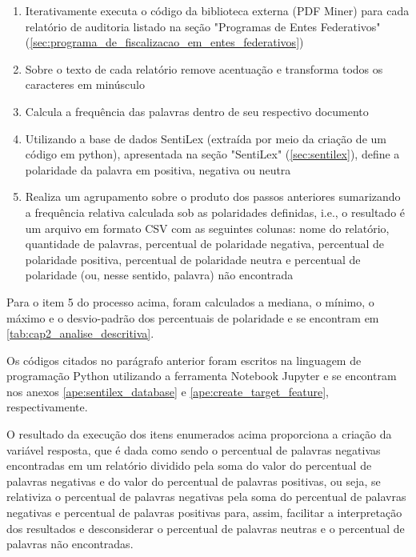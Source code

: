 \begin{enumerate}
	\item Iterativamente executa o código da biblioteca externa (PDF Miner) para cada relatório de auditoria listado na seção "Programas de Entes Federativos" (\ref{sec:programa_de_fiscalizacao_em_entes_federativos})
	\item Sobre o texto de cada relatório remove acentuação e transforma todos os caracteres em minúsculo
	\item Calcula a frequência das palavras dentro de seu respectivo documento
	\item Utilizando a base de dados SentiLex (extraída por meio da criação de um código em python), apresentada na seção "SentiLex" (\ref{sec:sentilex}), define a polaridade da palavra em positiva, negativa ou neutra
	\item Realiza um agrupamento sobre o produto dos passos anteriores sumarizando a frequência relativa calculada sob as polaridades definidas, i.e., o resultado é um arquivo em formato CSV com as seguintes colunas: nome do relatório, quantidade de palavras, percentual de polaridade negativa, percentual de polaridade positiva, percentual de polaridade neutra e percentual de polaridade (ou, nesse sentido, palavra) não encontrada
\end{enumerate}

Para o item 5 do processo acima, foram calculados a mediana, o mínimo, o máximo e o desvio-padrão dos percentuais de polaridade e se encontram em \ref{tab:cap2_analise_descritiva}.

Os códigos citados no parágrafo anterior foram escritos na linguagem de programação Python utilizando a ferramenta Notebook Jupyter e se encontram nos anexos \ref{ape:sentilex_database} e \ref{ape:create_target_feature}, respectivamente.

O resultado da execução dos itens enumerados acima proporciona a criação da variável resposta, que é dada como sendo o percentual de palavras negativas encontradas em um relatório dividido pela soma do valor do percentual de palavras negativas e do valor do percentual de palavras positivas, ou seja, se relativiza o percentual de palavras negativas pela soma do percentual de palavras negativas e percentual de palavras positivas para, assim, facilitar a interpretação dos resultados e desconsiderar o percentual de palavras neutras e o percentual de palavras não encontradas.

